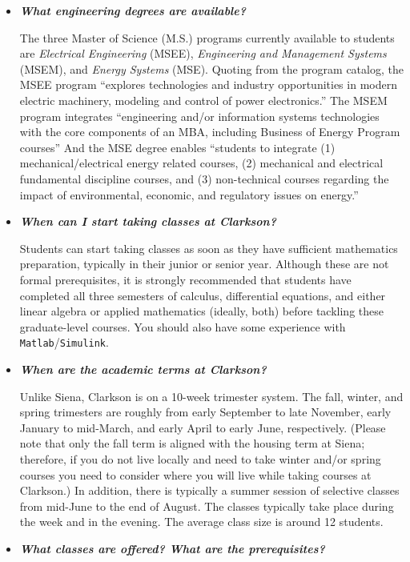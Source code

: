\documentclass[12pt]{article}
\begin{document}
\begin{itemize}
\item{{\bf {\em What engineering degrees are available?}}

The three Master of Science (M.S.) programs currently available to students are
{\em Electrical Engineering} (MSEE), {\em Engineering and Management Systems}
(MSEM), and {\em Energy Systems} (MSE).  Quoting from the program catalog, the
MSEE program ``explores technologies and industry opportunities in modern
electric machinery, modeling and control of power electronics.''  The MSEM
program integrates ``engineering and/or information systems technologies with
the core components of an MBA, including Business of Energy Program courses''
And the MSE degree enables ``students to integrate (1) mechanical/electrical
energy related courses, (2) mechanical and electrical fundamental discipline
courses, and (3) non-technical courses regarding the impact of environmental,
economic, and regulatory issues on energy.''}

\item{{\bf {\em When can I start taking classes at Clarkson?}}

Students can start taking classes as soon as they have sufficient mathematics
preparation, typically in their junior or senior year.  Although these are not
formal prerequisites, it is strongly recommended that students have completed
all three semesters of calculus, differential equations, and either linear
algebra or applied mathematics (ideally, both) before tackling these
graduate-level courses.  You should also have some experience with {\tt
  Matlab}/{\tt Simulink}.}

\item{{\bf {\em When are the academic terms at Clarkson?}}

Unlike Siena, Clarkson is on a 10-week trimester system.  The fall, winter, and
spring trimesters are roughly from early September to late November, early
January to mid-March, and early April to early June, respectively.  (Please note
that only the fall term is aligned with the housing term at Siena; therefore, if
you do not live locally and need to take winter and/or spring courses you need
to consider where you will live while taking courses at Clarkson.)  In addition,
there is typically a summer session of selective classes from mid-June to the
end of August.  The classes typically take place during the week and in the
evening.  The average class size is around 12 students.}

\item{{\bf {\em What classes are offered?  What are the prerequisites?}}

}
\end{itemize}
\end{document}
